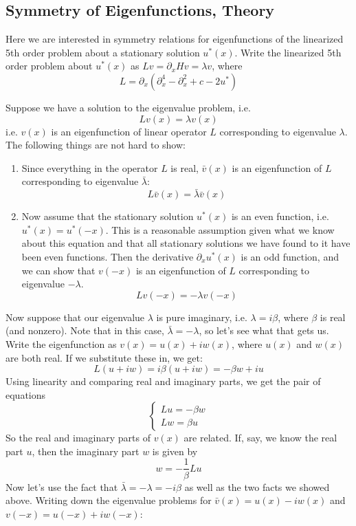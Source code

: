 \documentclass[12pt]{article}
\begin{document}
\subsection*{Symmetry of Eigenfunctions, Theory}
Here we are interested in symmetry relations for eigenfunctions of the linearized 5th order problem about a stationary solution $u^*(x)$. Write the linearized 5th order problem about $u^*(x)$ as $Lv = \partial_x Hv = \lambda v$, where
\[
L = \partial_x( \partial_x^4 - \partial_x^2 + c - 2u^*)
\]


Suppose we have a solution to the eigenvalue problem, i.e.
\[
Lv(x) = \lambda v(x)
\]
i.e. $v(x)$ is an eigenfunction of linear operator $L$ corresponding to eigenvalue $\lambda$.
The following things are not hard to show:
\begin{enumerate}
	\item Since everything in the operator $L$ is real, $\bar{v}(x)$ is an eigenfunction of $L$ corresponding to eigenvalue $\bar{\lambda}$:
	\[
	L\bar{v}(x) = \bar{\lambda} \bar{v}(x)
	\]
	\item Now assume that the stationary solution $u^*(x)$ is an even function, i.e. $u^*(x) = u^*(-x)$. This is a reasonable assumption given what we know about this equation and that all stationary solutions we have found to it have been even functions. Then the derivative $\partial_x u^*(x)$ is an odd function, and we can show that $v(-x)$ is an eigenfunction of $L$ corresponding to eigenvalue $-\lambda$.
	\[
	Lv(-x) = -\lambda v(-x)
	\]
\end{enumerate}
Now suppose that our eigenvalue $\lambda$ is pure imaginary, i.e. $\lambda = i \beta$, where $\beta$ is real (and nonzero). Note that in this case, $\bar{\lambda} = -\lambda$, so let's see what that gets us. Write the eigenfunction as $v(x) = u(x) + i w(x)$, where $u(x)$ and $w(x)$ are both real. If we substitute these in, we get:
\[
L(u+iw) = i\beta(u+iw) = -\beta w + i u
\]
Using linearity and comparing real and imaginary parts, we get the pair of equations
\[ \begin{cases}
Lu = -\beta w \\
Lw = \beta u
\end{cases}\]
So the real and imaginary parts of $v(x)$ are related. If, say, we know the real part $u$, then the imaginary part $w$ is given by
\[
w = -\frac{1}{\beta}Lu
\]
Now let's use the fact that $\bar{\lambda} = -\lambda = -i \beta$ as well as the two facts we showed above. Writing down the eigenvalue problems for $\bar{v}(x) = u(x) - i w(x)$ and $v(-x) = u(-x) + i w(-x)$:
\end{document}
